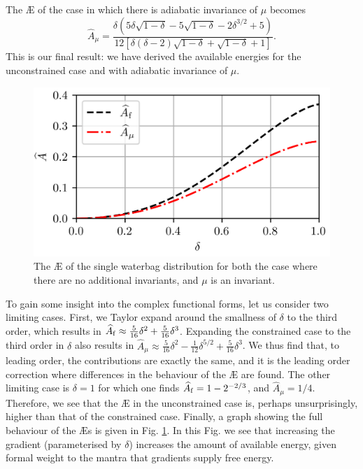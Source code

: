 The \AE{} of the case in which there is adiabatic invariance of $\mu$ becomes
\begin{equation}
    \widehat{A}_\mu = \frac{\delta  \left(5  \delta \sqrt{1-\delta } -5
   \sqrt{1-\delta } -2 \delta ^{3/2}+5\right)}{12 \left[\delta(\delta -2)\sqrt{1-\delta }
   +\sqrt{1-\delta }+1\right]}.
\end{equation}
This is our final result: we have derived the available energies for the unconstrained case and with adiabatic invariance of $\mu$. \par 
\begin{figure}
    \centering
    \includegraphics{3_chapters/0_introduction/img/AE.png}
    \caption{The \AE{} of the single waterbag distribution for both the case where there are no additional invariants, and $\mu$ is an invariant.}
    \label{fig: aes of the example}
\end{figure}
To gain some insight into the complex functional forms, let us consider two limiting cases. First, we Taylor expand around the smallness of $\delta$ to the third order, which results in $\widehat{A}_{\rm f}\approx \frac{5}{16} \delta^2 + \frac{5}{16} \delta^3$. Expanding the constrained case to the third order in $\delta$ also results in $\widehat{A}_\mu \approx \frac{5}{16} \delta^2 - \frac{1}{12}\delta^{5/2} + \frac{5}{16} \delta^3 $. We thus find that, to leading order, the contributions are exactly the same, and it is the leading order correction where differences in the behaviour of the \AE{} are found. The other limiting case is $\delta=1$ for which one finds $\widehat{A}_{\rm f}=1-2^{-2/3}$, and $\widehat{A}_\mu=1/4$. Therefore, we see that the \AE{} in the unconstrained case is, perhaps unsurprisingly, higher than that of the constrained case. Finally, a graph showing the full behaviour of the \AE{}s is given in Fig. \ref{fig: aes of the example}. In this Fig. we see that increasing the gradient (parameterised by $\delta$) increases the amount of available energy, given formal weight to the mantra that gradients supply free energy. \par

